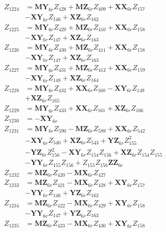 \begin{multicols}{2}
\begin{align}
Z_{1224} &= \mathbf{MY}_{6r}Z_{428} + \mathbf{MZ}_{6r}Z_{409} + \mathbf{XX}_{6r}Z_{157}  \nonumber \\
&- \mathbf{XY}_{6r}Z_{146} + \mathbf{XZ}_{6r}Z_{162} \nonumber \\
Z_{1225} &= \mathbf{MY}_{6r}Z_{429} + \mathbf{MZ}_{6r}Z_{410} + \mathbf{XX}_{6r}Z_{158}  \nonumber \\
&- \mathbf{XY}_{6r}Z_{147} + \mathbf{XZ}_{6r}Z_{163} \nonumber \\
Z_{1226} &= \mathbf{MY}_{6r}Z_{430} + \mathbf{MZ}_{6r}Z_{411} + \mathbf{XX}_{6r}Z_{158}  \nonumber \\
&- \mathbf{XY}_{6r}Z_{147} + \mathbf{XZ}_{6r}Z_{163} \nonumber \\
Z_{1227} &= \mathbf{MY}_{6r}Z_{431} + \mathbf{MZ}_{6r}Z_{412} + \mathbf{XX}_{6r}Z_{159}  \nonumber \\
&- \mathbf{XY}_{6r}Z_{148} + \mathbf{XZ}_{6r}Z_{164} \nonumber \\
Z_{1228} &= \mathbf{MY}_{6r}Z_{432} + \mathbf{XX}_{6r}Z_{160} - \mathbf{XY}_{6r}Z_{149}  \nonumber \\
&+ \mathbf{XZ}_{6r}Z_{165} \nonumber \\
Z_{1229} &= \mathbf{MY}_{6r}Z_{433} + \mathbf{XX}_{6r}Z_{161} + \mathbf{XZ}_{6r}Z_{166} \nonumber \\
Z_{1230} &= -\mathbf{XY}_{6r} \nonumber \\
Z_{1231} &= \mathbf{MY}_{6r}Z_{590} - \mathbf{MZ}_{6r}Z_{589} + \mathbf{XX}_{6r}Z_{542}  \nonumber \\
&- \mathbf{XY}_{6r}Z_{540} + \mathbf{XZ}_{6r}Z_{543} + \mathbf{YZ}_{6r}Z_{155}^2  \nonumber \\
&- \mathbf{YZ}_{6r}Z_{156}^2 - \mathbf{XY}_{6r}Z_{154}Z_{156} + \mathbf{XZ}_{6r}Z_{154}Z_{155}  \nonumber \\
&- \mathbf{YY}_{6r}Z_{155}Z_{156} + Z_{155}Z_{156}\mathbf{ZZ}_{6r} \nonumber \\
Z_{1232} &= \mathbf{MZ}_{6r}Z_{420} - \mathbf{MX}_{6r}Z_{427} \nonumber \\
Z_{1233} &= \mathbf{MZ}_{6r}Z_{421} - \mathbf{MX}_{6r}Z_{428} + \mathbf{XY}_{6r}Z_{157}  \nonumber \\
&- \mathbf{YY}_{6r}Z_{146} + \mathbf{YZ}_{6r}Z_{162} \nonumber \\
Z_{1234} &= \mathbf{MZ}_{6r}Z_{422} - \mathbf{MX}_{6r}Z_{429} + \mathbf{XY}_{6r}Z_{158}  \nonumber \\
&- \mathbf{YY}_{6r}Z_{147} + \mathbf{YZ}_{6r}Z_{163} \nonumber \\
Z_{1235} &= \mathbf{MZ}_{6r}Z_{423} - \mathbf{MX}_{6r}Z_{430} + \mathbf{XY}_{6r}Z_{158}  \nonumber \\

\end{align}
\end{multicols}
